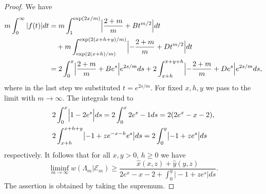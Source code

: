 \documentclass[a4paper]{amsart} %
\theoremstyle{definition}
\theoremstyle{remark}
\numberwithin{equation}{section}
\newcommand*{\weakconstrestricted}[2]{w(#1|#2)} %
\newcommand*{\fclass}[1]{\mathcal{E}_{#1}}
\newcommand*{\dZero}{B}%
\newcommand*{\dOne}{D}%
\newcommand*{\xGain}{\hat{x}}
\newcommand*{\yGain}{\hat{y}}
\begin{document}
\begin{proof}
	
	
	
	We have 
	\begin{align*}
	m \int_0^\infty |f(t)| dt 
	&=m\int_{1}^{\exp(2x/m)} \Bigl| \frac{2+m}{m} + \dZero t^{m/2}\Bigr| dt\\
	&\quad  
	+ m\int_{\exp(2(x+h)/m)}^{\exp(2(x+h+y)/m)} \Bigl| -\frac{2+m}{m} + \dOne t^{m/2}\Bigr| dt\nonumber\\
	&= 2 \int_{0}^{x} \Bigl| \frac{2+m}{m} + \dZero e^{s} \Bigr| e^{2s/m} ds 
	+  2\int_{x+h}^{x+y+h} \Bigl| -\frac{2+m}{m} + \dOne e^{s} \Bigr| e^{2s/m} ds,
	\end{align*}
	where in the last step we substituted $t = e^{2s/m}$.
	For fixed $x, h, y$ we pass to the limit with $m\to\infty$.
	The integrals tend to
	\begin{align*}
	&2\int_{0}^{x} \Bigl| 1 - 2 e^{s}\Bigr| ds    
	=  2\int_{0}^{x} 2 e^{s} -1 ds  
	= 2(2e^{x} -x - 2),\\
	&2 \int_{x+ h }^{x+h+y} \bigl| -1 +  z e^{-x -h}  e^{s}\bigr| ds
	= 2\int_{0 }^{y} \bigl| -1 +  z e^{s}\bigr| ds
	\end{align*}
	respectively.
	It follows that for all $x,y>0$, $h\geq 0$ we have
	\begin{equation*}
	\liminf_{m\to \infty} \weakconstrestricted{\Lambda_m}{\fclass{m}}
	\geq 
	\frac{\xGain(x,z) + \yGain(y,z)}{ 2e^{x} -x - 2  +   \int_{0 }^{y} \bigl| -1 +  z e^{s}\bigr| ds }.
	\end{equation*}
	The assertion is obtained by taking the supremum.
\end{proof}
\end{document}
